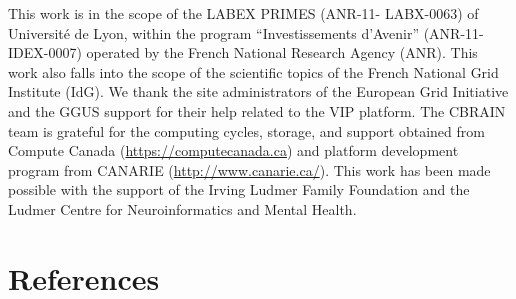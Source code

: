 \documentclass[preprint,3p,twocolumn]{elsarticle}
\newcommand{\closedanswerednote}[6]{}
\begin{document}
This work is in the scope of the LABEX PRIMES (ANR-11- LABX-0063) of
Universit\'e de Lyon, within the program ``Investissements d’Avenir''
(ANR-11-IDEX-0007) operated by the French National Research Agency
(ANR). This work also falls into the scope of the scientific topics of
the French National Grid Institute (IdG). We thank the site
administrators of the European Grid Initiative and the GGUS support
for their help related to the VIP platform. The CBRAIN team is grateful for the
computing cycles, storage, and support obtained from Compute Canada
(\url{https://computecanada.ca}) and platform development program from CANARIE
 (\url{http://www.canarie.ca/}). This work has been made possible with the support of the Irving Ludmer Family Foundation and
the Ludmer Centre for Neuroinformatics and Mental Health. \closedanswerednote{Marc-e}{Would it be proper to thank EGI?
  Compute Canada? CANARIE?}{Tristan}{Added EGI and Compute Canada. Not sure if
  Canarie should be added. What about Calcul QC?}{Marc-e}{CQ, no. CANARIE, I'd
  say yes since they funded a major chunk of CBRAIN's development.}

\section*{References}

\enlargethispage{5mm}


\end{document}
